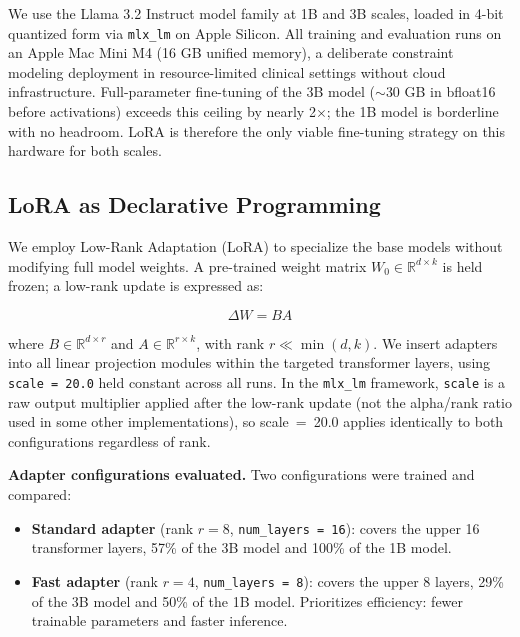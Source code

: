 \documentclass[ASNA,twocolumn]{USG} %
\begin{document}
We use the Llama 3.2 Instruct model family \cite{dubey2024llama3} at 1B and 3B scales, loaded in 4-bit quantized form via \texttt{mlx\_lm} \cite{apple2023mlx} on Apple Silicon. All training and evaluation runs on an Apple Mac Mini M4 (16 GB unified memory), a deliberate constraint modeling deployment in resource-limited clinical settings without cloud infrastructure. Full-parameter fine-tuning of the 3B model ($\sim$30 GB in bfloat16 before activations) exceeds this ceiling by nearly 2$\times$; the 1B model is borderline with no headroom. LoRA is therefore the only viable fine-tuning strategy on this hardware for both scales.

\subsection{LoRA as Declarative Programming}

We employ Low-Rank Adaptation (LoRA) \cite{hu2022lora} to specialize the base models without modifying full model weights. A pre-trained weight matrix $W_0 \in \mathbb{R}^{d \times k}$ is held frozen; a low-rank update is expressed as:

\begin{equation}
\Delta W = BA
\end{equation}

where $B \in \mathbb{R}^{d \times r}$ and $A \in \mathbb{R}^{r \times k}$, with rank $r \ll \min(d, k)$. We insert adapters into all linear projection modules within the targeted transformer layers, using \texttt{scale = 20.0} held constant across all runs. In the \texttt{mlx\_lm} framework, \texttt{scale} is a raw output multiplier applied after the low-rank update (not the alpha/rank ratio used in some other implementations), so scale~=~20.0 applies identically to both configurations regardless of rank.

\textbf{Adapter configurations evaluated.} Two configurations were trained and compared:

\begin{itemize}
    \item \textbf{Standard adapter} (rank $r = 8$, \texttt{num\_layers = 16}): covers the upper 16 transformer layers, 57\% of the 3B model and 100\% of the 1B model.
    \item \textbf{Fast adapter} (rank $r = 4$, \texttt{num\_layers = 8}): covers the upper 8 layers, 29\% of the 3B model and 50\% of the 1B model. Prioritizes efficiency: fewer trainable parameters and faster inference.
\end{itemize}
\end{document}
